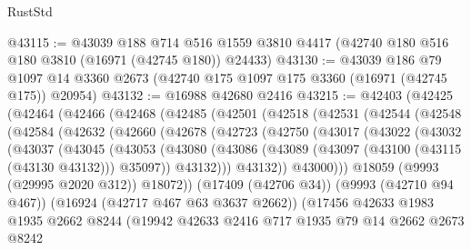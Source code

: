 \begin{lexlean}{RustStd}
\begin{coremodule}
@43115 := @43039
    @188
    @714
    @516
    @1559
    @3810
    @4417
    (@42740 @180 @516 @180 @3810 (@16971 (@42745 @180)) @24433)
@43130 := @43039
    @186
    @79
    @1097
    @14
    @3360
    @2673
    (@42740 @175 @1097 @175 @3360 (@16971 (@42745 @175)) @20954)
@43132 := @16988 @42680 @2416
@43215 := @42403
    (@42425
      (@42464
        (@42466
          (@42468
            (@42485
              (@42501
                (@42518
                  (@42531
                    (@42544
                      (@42548
                        (@42584
                          (@42632
                            (@42660
                              (@42678
                                (@42723
                                  (@42750
                                    (@43017
                                      (@43022
                                        (@43032
                                          (@43037
                                            (@43045
                                              (@43053
                                                (@43080
                                                  (@43086
                                                    (@43089
                                                      (@43097
                                                        (@43100 (@43115 (@43130 @43132)))
                                                        @35097))
                                                    @43132)))
                                              @43132))
                                          @43000)))
                                    @18059
                                    (@9993 (@29995 @2020 @312))
                                    @18072))
                                (@17409 (@42706 @34))
                                (@9993 (@42710 @94 @467))
                                (@16924 (@42717 @467 @63 @3637 @2662))
                                (@17456
                                  @42633
                                  @1983
                                  @1935
                                  @2662
                                  @8244
                                  (@19942
                                    @42633
                                    @2416
                                    @717
                                    @1935
                                    @79
                                    @14
                                    @2662
                                    @2673
                                    @8242

\end{coremodule}
\end{lexlean}
